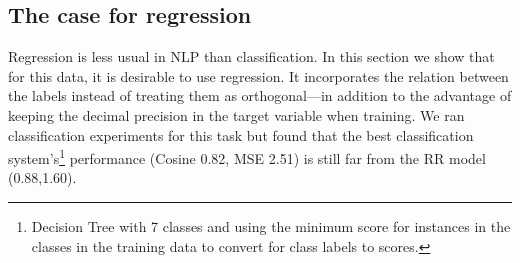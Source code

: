 \documentclass[11pt,letterpaper]{article}
\begin{document}
\subsection{The case for regression} 
\label{subsec:forregression}
Regression is less usual in NLP than classification. In this section we show that for this data, it is desirable to use regression. %
It incorporates the relation between the labels instead of treating them as orthogonal---in addition to the advantage of keeping the decimal precision in the target variable when training.
We ran classification experiments for this task but found that the best classification system's\footnote{Decision Tree with 7 classes and using the minimum score for instances in the classes in the training data to convert for class labels to scores.}  %
performance (Cosine 0.82, MSE 2.51) is still far from the {\sc RR} model (0.88,1.60). 

%
%
\end{document}
